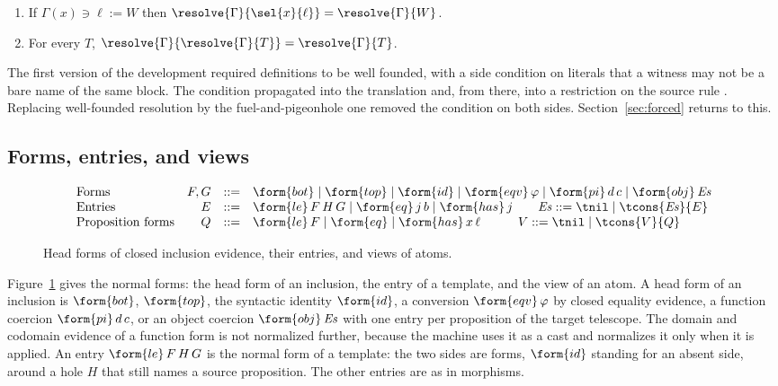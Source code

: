 \begin{lemma}[Resolution]\label{lem:resolve}
\begin{enumerate}
\item If $\Gamma(x) \ni \ell \mathrel{:=} W$ then $\resolve{\Gamma}{\sel{x}{\ell}} = \resolve{\Gamma}{W}$.
\item For every $T$, $\resolve{\Gamma}{\resolve{\Gamma}{T}} = \resolve{\Gamma}{T}$.
\end{enumerate}
\end{lemma}

The first version of the development required definitions to be well founded, with a side condition on literals that a witness may not be a bare name of the same block. The condition propagated into the translation and, from there, into a restriction on the source rule . Replacing well-founded resolution by the fuel-and-pigeonhole one removed the condition on both sides. Section~\ref{sec:forced} returns to this.

\subsection{Forms, entries, and views}

\begin{figure}
\small
\[
\begin{array}{@{}lrcl@{}}
\text{Forms} & F,G & ::= & \form{bot} \mid \form{top} \mid \form{id} \mid \form{eqv}\,\varphi \mid \form{pi}\,d\,c \mid \form{obj}\,\mathit{Es} \\
\text{Entries} & E & ::= & \form{le}\,F\,H\,G \mid \form{eq}\,j\,b \mid \form{has}\,j \qquad \mathit{Es} ::= \tnil \mid \tcons{\mathit{Es}}{E} \\
\text{Proposition forms} & Q & ::= & \form{le}\,F \mid \form{eq} \mid \form{has}\,x\,\ell \qquad\quad V ::= \tnil \mid \tcons{V}{Q}
\end{array}
\]
\caption{Head forms of closed inclusion evidence, their entries, and views of atoms.}
\label{fig:forms}
\end{figure}

Figure~\ref{fig:forms} gives the normal forms: the head form of an inclusion, the entry of a template, and the view of an atom. A head form of an inclusion is $\form{bot}$, $\form{top}$, the syntactic identity $\form{id}$, a conversion $\form{eqv}\,\varphi$ by closed equality evidence, a function coercion $\form{pi}\,d\,c$, or an object coercion $\form{obj}\,\mathit{Es}$ with one entry per proposition of the target telescope. The domain and codomain evidence of a function form is not normalized further, because the machine uses it as a cast and normalizes it only when it is applied. An entry $\form{le}\,F\,H\,G$ is the normal form of a template: the two sides are forms, $\form{id}$ standing for an absent side, around a hole $H$ that still names a source proposition. The other entries are as in morphisms.

